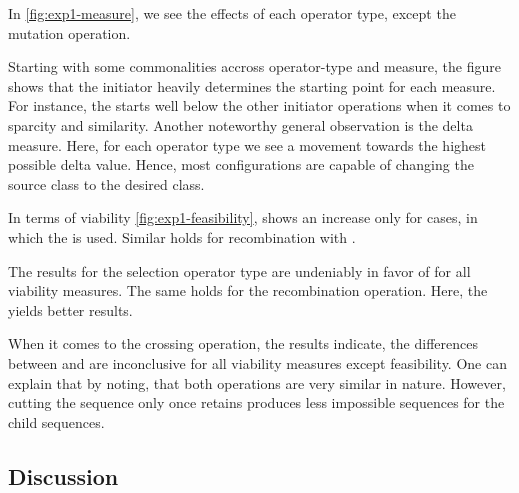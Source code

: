 \documentclass[./../../paper.tex]{subfiles}
\begin{document}
In \autoref{fig:exp1-measure}, we see the effects of each operator type, except the mutation operation. 

Starting with some commonalities accross operator-type and measure, the figure shows that the initiator heavily determines the starting point for each measure. For instance, the  starts well below the other initiator operations when it comes to sparcity and similarity. 
Another noteworthy general observation is the delta measure. Here, for each operator type we see a movement towards the highest possible delta value. Hence, most configurations are capable of changing the source class to the desired class. 

In terms of viability \autoref{fig:exp1-feasibility}, shows an increase only for cases, in which the  is used. Similar holds for recombination with .

The results for the selection operator type are undeniably in favor of  for all viability measures. The same holds for the recombination operation. Here, the  yields better results.

When it comes to the crossing operation, the results indicate, the differences between  and  are inconclusive for all viability measures except feasibility. One can explain that by noting, that both operations are very similar in nature. However, cutting the sequence only once retains produces less impossible sequences for the child sequences.



\subsection{Discussion}
\end{document}
